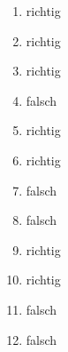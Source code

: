 \documentclass[a4paper, 12pt, margins=2cm]{homework}
\begin{document}
  \begin{problem}
  \end{problem}
  \begin{solution}
    \hfill
    \begin{enumerate}[label=(\arabic*)]\itemsep0pt
      \item richtig
      \item richtig
      \item richtig
      \item falsch
      \item richtig
      \item richtig
      \item falsch
      \item falsch
      \item richtig
      \item richtig 
      \item falsch
      \item falsch
    \end{enumerate}
  \end{solution}
\end{document}
